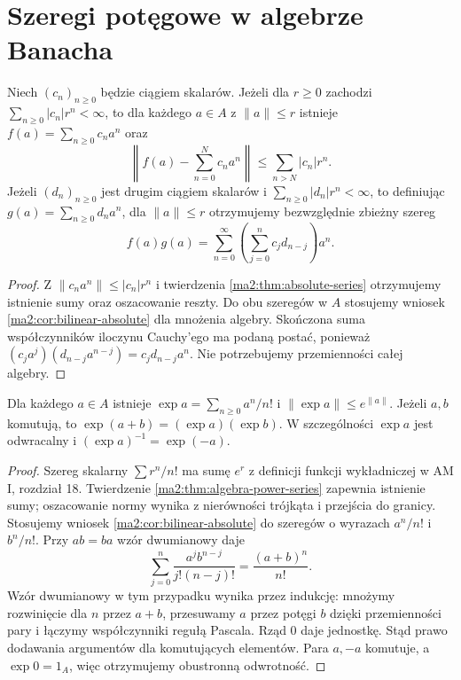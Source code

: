 \section{Szeregi potęgowe w algebrze Banacha}

\begin{twierdzenie}
\label{ma2:thm:algebra-power-series}
Niech $(c_n)_{n\ge0}$ będzie ciągiem skalarów.
Jeżeli dla $r\ge0$ zachodzi $\sum_{n\ge0}|c_n|r^n<\infty$,
to dla każdego $a\in A$ z $\|a\|\le r$ istnieje
$f(a)=\sum_{n\ge0}c_na^n$ oraz
\[
 \left\|f(a)-\sum_{n=0}^N c_na^n\right\|
 \le\sum_{n>N}|c_n|r^n.
\]
Jeżeli $(d_n)_{n\ge0}$ jest drugim ciągiem skalarów
i $\sum_{n\ge0}|d_n|r^n<\infty$, to definiując
$g(a)=\sum_{n\ge0}d_na^n$, dla $\|a\|\le r$
otrzymujemy bezwzględnie zbieżny szereg
\[
 f(a)g(a)=\sum_{n=0}^\infty
     \left(\sum_{j=0}^n c_jd_{n-j}\right)a^n.
\]
\end{twierdzenie}
\begin{proof}
Z $\|c_na^n\|\le |c_n|r^n$ i twierdzenia
\ref{ma2:thm:absolute-series} otrzymujemy
istnienie sumy oraz oszacowanie reszty.
Do obu szeregów w $A$ stosujemy wniosek
\ref{ma2:cor:bilinear-absolute} dla mnożenia
algebry. Skończona suma współczynników
iloczynu Cauchy'ego ma podaną postać, ponieważ
$(c_ja^j)(d_{n-j}a^{n-j})=c_jd_{n-j}a^n$.
Nie potrzebujemy przemienności całej algebry.
\end{proof}

\begin{wniosek}
\label{ma2:cor:algebra-exp}
Dla każdego $a\in A$ istnieje
$\exp a=\sum_{n\ge0}a^n/n!$ i $\|\exp a\|\le e^{\|a\|}$.
Jeżeli $a,b$ komutują, to
$\exp(a+b)=(\exp a)(\exp b)$.
W szczególności $\exp a$ jest odwracalny i
$(\exp a)^{-1}=\exp(-a)$.
\end{wniosek}
\begin{proof}
Szereg skalarny $\sum r^n/n!$ ma sumę $e^r$
z definicji funkcji wykładniczej w AM I,
rozdział 18. Twierdzenie
\ref{ma2:thm:algebra-power-series} zapewnia
istnienie sumy; oszacowanie normy wynika
z nierówności trójkąta i przejścia do granicy.
Stosujemy wniosek \ref{ma2:cor:bilinear-absolute}
do szeregów o wyrazach $a^n/n!$ i $b^n/n!$.
Przy $ab=ba$ wzór dwumianowy daje
\[
 \sum_{j=0}^n\frac{a^jb^{n-j}}{j!(n-j)!}
 =\frac{(a+b)^n}{n!}.
\]
Wzór dwumianowy w tym przypadku wynika przez
indukcję: mnożymy rozwinięcie dla $n$ przez
$a+b$, przesuwamy $a$ przez potęgi $b$ dzięki
przemienności pary i łączymy współczynniki
regułą Pascala. Rząd $0$ daje jednostkę.
Stąd prawo dodawania argumentów dla
komutujących elementów. Para $a,-a$ komutuje,
a $\exp0=1_A$, więc otrzymujemy obustronną odwrotność.
\end{proof}

